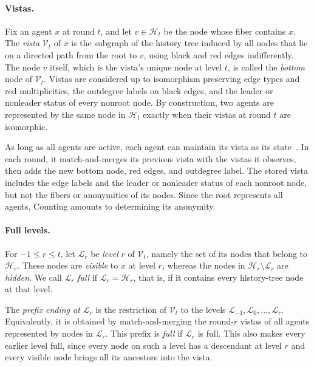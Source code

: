 \documentclass[11pt]{article}
\begin{document}
\paragraph{Vistas.}
Fix an agent \(x\) at round \(t\), and let
\(v\in\mathcal H_t\) be the node whose fiber contains \(x\).  The
\emph{vista} \(\mathcal V_t\) of \(x\) is the subgraph of the history
tree induced by all nodes that lie on a directed path from the root to
\(v\), using black and red edges indifferently.
The node \(v\) itself, which is the vista's unique node at level
\(t\), is called the \emph{bottom} node of \(\mathcal V_t\).  Vistas are considered up to isomorphism
preserving edge types and red multiplicities, the outdegree labels on black
edges, and the leader or nonleader status of every nonroot node.  By construction, two
agents are represented by the same node in \(\mathcal H_t\) exactly when their vistas at
round \(t\) are isomorphic.

As long as all agents are active, each agent can maintain its vista
as its state~\cite{VIG24}. In each round, it match-and-merges its
previous vista with the vistas it observes, then adds the new bottom
node, red edges, and outdegree label.
The stored vista includes the edge labels and the leader or nonleader
status of each nonroot node, but not the fibers or anonymities of its
nodes. Since the root represents all agents, Counting amounts to
determining its anonymity.


\paragraph{Full levels.} For \(-1\leq r\leq t\), let \(\mathcal L_r\) be \emph{level} \(r\)
of \(\mathcal V_t\), namely the set of its nodes that belong to
\(\mathcal H_r\). These nodes are \emph{visible} to \(x\) at level
\(r\), whereas the nodes in \(\mathcal H_r\setminus\mathcal L_r\)
are \emph{hidden}.
We call \(\mathcal L_r\) \emph{full} if
\(\mathcal L_r=\mathcal H_r\), that is, if it contains every
history-tree node at that level.

The \emph{prefix ending at \(\mathcal L_r\)} is the
restriction of \(\mathcal V_t\) to the levels
\(\mathcal L_{-1},\mathcal L_0,\ldots,\mathcal L_r\).  Equivalently, it is
obtained by match-and-merging the round-\(r\) vistas of all agents
represented by nodes in \(\mathcal L_r\).  This prefix is \emph{full} if
\(\mathcal L_r\) is full.  This also makes every earlier level full,
since every node on such a level has a descendant at level \(r\) and every
visible node brings all its ancestors into the vista.
\end{document}
